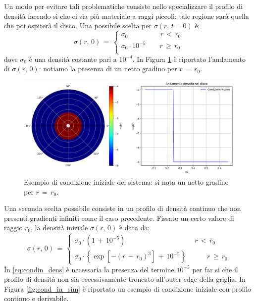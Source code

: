 Un modo per evitare tali problematiche consiste nello specializzare il profilo di densità facendo sì che ci sia più materiale a raggi piccoli: tale regione sarà quella che poi ospiterà il disco. 
Una possibile scelta per $\sigma(r,\,t=0)$ è:
\begin{equation}
\sigma(r,\,0)\,=\,\begin{cases}
\sigma_0 \qquad \qquad\,\,\,\,r\,<\,r_0\\
\sigma_0\cdot10^{-5} \qquad r\,\geq\,r_0\\
\end{cases}
\label{eq:condin_dens_gr}
\end{equation}
dove $\sigma_0$ è una densità costante pari a $10^{-4}.$  In Figura \ref{fig:cond_in_sim_gr} è riportato l'andamento di $\sigma(r,\,0)$: notiamo la presenza di un netto gradino per $r\,=\,r_0$.
\begin{figure}[h]
    \centering
    \includegraphics[width=\textwidth]{Immagini/Simulazioni/CondizioneIniziale_grad.png}
    \caption{Esempio di condizione iniziale del sistema: si nota un netto gradino per $r\,=\,r_0$.}
    \label{fig:cond_in_sim_gr}
\end{figure}
Una seconda scelta possibile consiste in un profilo di densità continuo che non presenti gradienti infiniti come il caso precedente.
Fissato un certo valore di raggio $r_0$, la densità iniziale $\sigma(r,\,0)$ è data da:
\begin{equation}
\sigma(r,\,0)\,=\,\begin{cases}
\sigma_0 \cdot (1\,+\,10^{-5}) \qquad \qquad \qquad \qquad \qquad r\,<\,r_0 \\
\sigma_0 \cdot \left\{\exp{[-(r\,-\,r_0)^3]}\,+\,10^{-5}\right\} \qquad \quad r\,\geq\, r_0
\end{cases}
\label{eq:condin_dens}
\end{equation}
\'In \eqref{eq:condin_dens} è necessaria la presenza del termine $10^{-5}$ per far si che il profilo di densità non sia eccessivamente troncato all'outer edge della griglia. In Figura \ref{fig:cond_in_sim} è riportato un esempio di condizione iniziale con profilo continuo e derivabile.

